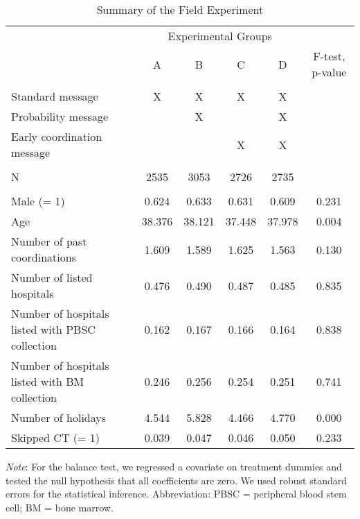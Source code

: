 \documentclass[12pt, a4paper]{article}
\begin{document}
\begin{table}

\caption{\label{tab:summary}Summary of the Field Experiment}
\centering
\fontsize{9}{11}\selectfont
\begin{threeparttable}
\begin{tabular}[t]{lccccc}
\toprule
\multicolumn{1}{c}{ } & \multicolumn{4}{c}{Experimental Groups} & \multicolumn{1}{c}{ } \\
\cmidrule(l{3pt}r{3pt}){2-5}
 & A & B & C & D & F-test, p-value\\
\midrule
\addlinespace[0.3em]
\multicolumn{6}{l}{\textbf{A. Interventions}}\\
\hspace{1em}Standard message & X & X & X & X & \\
\hspace{1em}Probability message &  & X &  & X & \\
\hspace{1em}Early coordination message &  &  & X & X & \\
\addlinespace[0.3em]
\multicolumn{6}{l}{\textbf{B. Sample Size}}\\
\hspace{1em}N & 2535 & 3053 & 2726 & 2735 & \\
\addlinespace[0.3em]
\multicolumn{6}{l}{\textbf{C. Balance Test}}\\
\hspace{1em}Male (= 1) & 0.624 & 0.633 & 0.631 & 0.609 & 0.231\\
\hspace{1em}Age & 38.376 & 38.121 & 37.448 & 37.978 & 0.004\\
\hspace{1em}Number of past coordinations & 1.609 & 1.589 & 1.625 & 1.563 & 0.130\\
\hspace{1em}Number of listed hospitals & 0.476 & 0.490 & 0.487 & 0.485 & 0.835\\
\hspace{1em}Number of hospitals listed with PBSC collection & 0.162 & 0.167 & 0.166 & 0.164 & 0.838\\
\hspace{1em}Number of hospitals listed with BM collection & 0.246 & 0.256 & 0.254 & 0.251 & 0.741\\
\hspace{1em}Number of holidays & 4.544 & 5.828 & 4.466 & 4.770 & 0.000\\
\hspace{1em}Skipped CT (= 1) & 0.039 & 0.047 & 0.046 & 0.050 & 0.233\\
\bottomrule
\end{tabular}
\begin{tablenotes}
\item \emph{Note}: For the balance test, we regressed a covariate on treatment dummies and tested the null hypothesis that all coefficients are zero. We used robust standard errors for the statistical inference. Abbreviation: PBSC = peripheral blood stem cell; BM = bone marrow.
\end{tablenotes}
\end{threeparttable}
\end{table}
\end{document}
